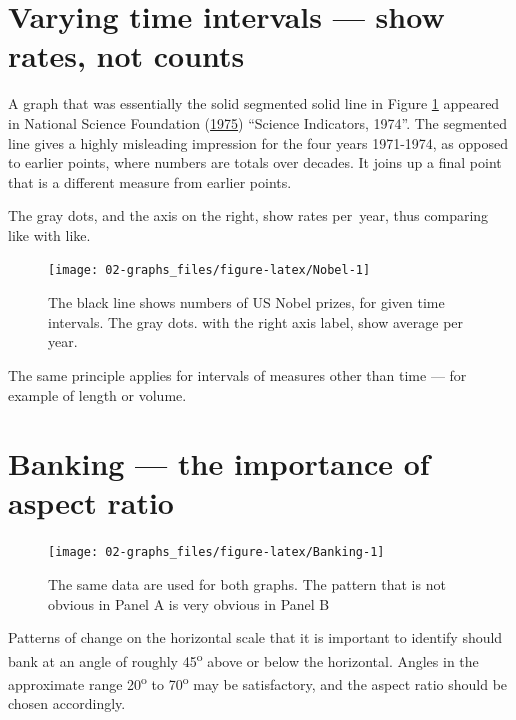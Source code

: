 \documentclass[
  10pt,
  b5paper]{book}
\begin{document}
\hypertarget{varying-time-intervals-show-rates-not-counts}{%
\section{Varying time intervals --- show rates, not counts}\label{varying-time-intervals-show-rates-not-counts}}

A graph that was essentially the solid segmented solid line in
Figure \ref{fig:Nobel} appeared in National Science Foundation (\protect\hyperlink{ref-national1975science}{1975})
``Science Indicators, 1974''. The segmented line gives
a highly misleading impression for the four years 1971-1974, as
opposed to earlier points, where numbers are totals over decades.
It joins up a final point that is a different measure from earlier
points.

The gray dots, and the axis on the right, show rates per~year,
thus comparing like with like.

\begin{figure}[H]

{\centering \texttt{[image: 02-graphs\_files/figure-latex/Nobel-1]} 

}

\caption{The black line shows numbers of US Nobel prizes, for given time intervals. The gray dots. with the right axis label, show average per year.}\label{fig:Nobel}
\end{figure}

The same principle applies for intervals of measures
other than time --- for example of length or volume.

\hypertarget{banking-the-importance-of-aspect-ratio}{%
\section{Banking --- the importance of aspect ratio}\label{banking-the-importance-of-aspect-ratio}}

\begin{figure}[H]

{\centering \texttt{[image: 02-graphs\_files/figure-latex/Banking-1]} 

}

\caption{The same data are used for both graphs.  The pattern that is not
obvious in Panel A is very obvious in Panel B}\label{fig:Banking}
\end{figure}

Patterns of change on the horizontal scale that it is
important to identify should bank at an angle of roughly 45\textsuperscript{o}
above or below the horizontal. Angles in
the approximate range 20\textsuperscript{o} to 70\textsuperscript{o} may be satisfactory,
and the aspect ratio should be chosen accordingly.
\end{document}
